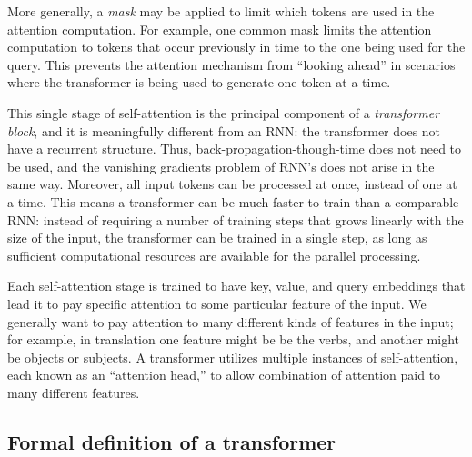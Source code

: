 More generally, a {\em mask} may be applied to limit which tokens are used in the attention computation.  For example, one common mask limits the attention computation to tokens that occur previously in time to the one being used for the query.  This prevents the attention mechanism from ``looking ahead'' in scenarios where the transformer is being used to generate one token at a time.

This single stage of self-attention is the principal component of a {\em transformer block}, and it is meaningfully different from an RNN: the transformer does not have a recurrent structure.  Thus, back-propagation-though-time does not need to be used, and the vanishing gradients problem of RNN's does not arise in the same way.  Moreover, all input tokens can be processed at once, instead of one at a time.  This means a transformer can be much faster to train than a comparable RNN: instead of requiring a number of training steps that grows linearly with the size of the input, the transformer can be trained in a single step, as long as sufficient computational resources are available for the parallel processing.

Each self-attention stage is trained to have key, value, and query embeddings that lead it to pay specific attention to some particular feature of the input.  We generally want to pay attention to many different kinds of features in the input; for example, in translation one feature might be be the verbs, and another might be objects or subjects.  A transformer utilizes multiple instances of self-attention, each known as an ``attention head,'' to allow combination of attention paid to many different features.

\subsection{Formal definition of a transformer}

